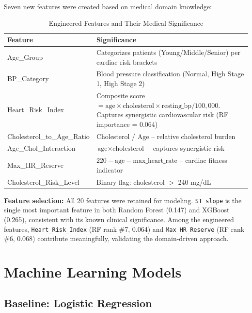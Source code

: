 \documentclass[12pt,a4paper]{article}
\begin{document}
Seven new features were created based on medical domain knowledge:

\begin{table}[H]
\centering
\caption{Engineered Features and Their Medical Significance}
\begin{tabular}{|l|p{8.5cm}|}
\hline
\textbf{Feature} & \textbf{Significance} \\
\hline
Age\_Group & Categorizes patients (Young/Middle/Senior) per cardiac risk brackets \\
BP\_Category & Blood pressure classification (Normal, High Stage 1, High Stage 2) \\
Heart\_Risk\_Index & Composite score $= \text{age} \times \text{cholesterol} \times \text{resting\_bp} / 100{,}000$. Captures synergistic cardiovascular risk (RF importance = 0.064) \\
Cholesterol\_to\_Age\_Ratio & Cholesterol / Age -- relative cholesterol burden \\
Age\_Chol\_Interaction & $\text{age} \times \text{cholesterol}$ -- captures synergistic risk \\
Max\_HR\_Reserve & $220 - \text{age} - \text{max\_heart\_rate}$ -- cardiac fitness indicator \\
Cholesterol\_Risk\_Level & Binary flag: cholesterol $>$ 240 mg/dL \\
\hline
\end{tabular}
\end{table}

\textbf{Feature selection:} All 20 features were retained for modeling.  \texttt{ST slope} is the single most important feature in both Random Forest (0.147) and XGBoost (0.265), consistent with its known clinical significance.  Among the engineered features, \texttt{Heart\_Risk\_Index} (RF rank \#7, 0.064) and \texttt{Max\_HR\_Reserve} (RF rank \#6, 0.068) contribute meaningfully, validating the domain-driven approach.

\section{Machine Learning Models}

\subsection{Baseline: Logistic Regression}
\end{document}
